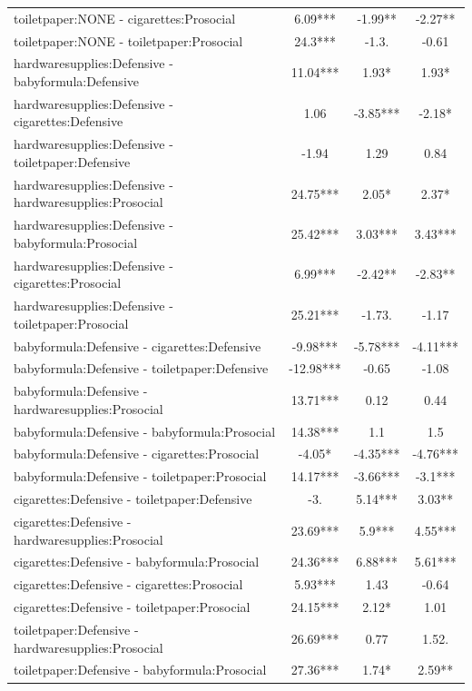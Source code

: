 \documentclass[]{report}
\begin{document}
\begin{longtable}{lccc}
			toiletpaper:NONE - cigarettes:Prosocial & 6.09*** & -1.99** & -2.27** \\ 
			toiletpaper:NONE - toiletpaper:Prosocial & 24.3*** & -1.3. & -0.61 \\ 
			hardwaresupplies:Defensive - babyformula:Defensive & 11.04*** & 1.93* & 1.93* \\ 
			hardwaresupplies:Defensive - cigarettes:Defensive & 1.06 & -3.85*** & -2.18* \\ 
			hardwaresupplies:Defensive - toiletpaper:Defensive & -1.94 & 1.29 & 0.84 \\ 
			hardwaresupplies:Defensive - hardwaresupplies:Prosocial & 24.75*** & 2.05* & 2.37* \\ 
			hardwaresupplies:Defensive - babyformula:Prosocial & 25.42*** & 3.03*** & 3.43*** \\ 
			hardwaresupplies:Defensive - cigarettes:Prosocial & 6.99*** & -2.42** & -2.83** \\ 
			hardwaresupplies:Defensive - toiletpaper:Prosocial & 25.21*** & -1.73. & -1.17 \\ 
			babyformula:Defensive - cigarettes:Defensive & -9.98*** & -5.78*** & -4.11*** \\ 
			babyformula:Defensive - toiletpaper:Defensive & -12.98*** & -0.65 & -1.08 \\ 
			babyformula:Defensive - hardwaresupplies:Prosocial & 13.71*** & 0.12 & 0.44 \\ 
			babyformula:Defensive - babyformula:Prosocial & 14.38*** & 1.1 & 1.5 \\ 
			babyformula:Defensive - cigarettes:Prosocial & -4.05* & -4.35*** & -4.76*** \\ 
			babyformula:Defensive - toiletpaper:Prosocial & 14.17*** & -3.66*** & -3.1*** \\ 
			cigarettes:Defensive - toiletpaper:Defensive & -3. & 5.14*** & 3.03** \\ 
			cigarettes:Defensive - hardwaresupplies:Prosocial & 23.69*** & 5.9*** & 4.55*** \\ 
			cigarettes:Defensive - babyformula:Prosocial & 24.36*** & 6.88*** & 5.61*** \\ 
			cigarettes:Defensive - cigarettes:Prosocial & 5.93*** & 1.43 & -0.64 \\ 
			cigarettes:Defensive - toiletpaper:Prosocial & 24.15*** & 2.12* & 1.01 \\ 
			toiletpaper:Defensive - hardwaresupplies:Prosocial & 26.69*** & 0.77 & 1.52. \\ 
			toiletpaper:Defensive - babyformula:Prosocial & 27.36*** & 1.74* & 2.59** \\ 

\end{longtable}
\end{document}
